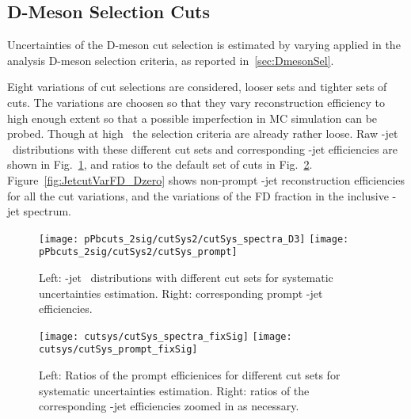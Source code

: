 \subsection{D-Meson Selection Cuts}
Uncertainties of the D-meson cut selection is estimated by varying applied in the analysis D-meson selection criteria, as reported in~\ref{sec:DmesonSel}. 

Eight variations of cut selections are considered, {} looser sets and {} tighter sets of cuts. The variations are choosen so that they vary \Dzero reconstruction efficiency to high enough extent so that a possible imperfection in MC simulation can be probed. Though at high \ptd\ the selection criteria are already rather loose.
Raw \Dzero-jet \pt\ distributions with these different cut sets and corresponding \Dzero-jet efficiencies are shown in Fig.~\ref{fig:JetPtRawSys_Dzero}, and ratios to the default set of cuts in Fig.~\ref{fig:JetPtRawSysRatio_Dzero}.
Figure~\ref{fig:JetcutVarFD_Dzero} shows non-prompt \Dzero-jet reconstruction efficiencies for all the cut variations, and the variations of the FD fraction in the inclusive \Dzero-jet spectrum.

\begin{figure}[bth]
\begin{center}
\texttt{[image: pPbcuts\_2sig/cutSys2/cutSys\_spectra\_D3]}
\texttt{[image: pPbcuts\_2sig/cutSys2/cutSys\_prompt]}
\caption{Left: \Dzero-jet \pt\ distributions with different cut sets for systematic uncertainties estimation. Right: corresponding prompt \Dzero-jet efficiencies.} 
\label{fig:JetPtRawSys_Dzero}
\end{center}
\end{figure}

\begin{figure}[bth]
\begin{center}
\texttt{[image: cutsys/cutSys\_spectra\_fixSig]}
\texttt{[image: cutsys/cutSys\_prompt\_fixSig]}
\caption{Left: Ratios of the prompt efficienices for different cut sets for systematic uncertainties estimation. Right: ratios of the corresponding \Dzero-jet efficiencies zoomed in as necessary.} 
\label{fig:JetPtRawSysRatio_Dzero}
\end{center}
\end{figure}

